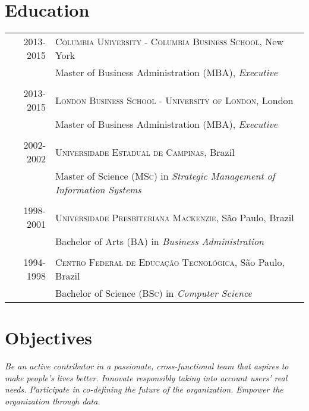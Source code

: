 \documentclass[a4paper,10pt]{article}
\begin{document}
\section{Education}
\begin{tabular}{rl}
 \textsc{2013-2015} & \textsc{Columbia University - Columbia Business School},
 New York\\

 & Master of Business Administration (\textsc{MBA}), \emph{Executive}\\

 &\\

 \textsc{2013-2015} & \textsc{London Business School - University of London},
 London\\

 & Master of Business Administration (\textsc{MBA}), \emph{Executive}\\

 &\\

 \textsc{2002-2002} & \textsc{Universidade Estadual de Campinas}, Brazil\\

 & Master of Science (\textsc{MSc}) in \emph{Strategic Management of Information
   Systems} \\

  &\\

 \textsc{1998-2001} & \textsc{Universidade Presbiteriana Mackenzie}, S\~{a}o
 Paulo, Brazil\\

 & Bachelor of Arts (\textsc{BA}) in \emph{Business Administration} \\

 &\\

 \textsc{1994-1998} & \textsc{Centro Federal de Educa\c{c}\~{a}o
   Tecnol\'{o}gica}, S\~{a}o Paulo, Brazil\\

 & Bachelor of Science (\textsc{BSc}) in \emph{Computer Science} \\

\end{tabular}

\section{Objectives}
\emph{Be an active contributor in a passionate, cross-functional team that
  aspires to make people's lives better. Innovate responsibly taking into
  account users' real needs. Participate in co-defining the future of the
  organization. Empower the organization through data.}
\end{document}
